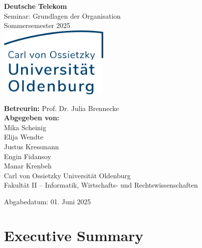 \documentclass[12pt,a4paper]{article}
\begin{document}
	
	\begin{titlepage}
		\centering
		\vfill
		{\Huge \textbf{Deutsche Telekom}}\\[1.5cm]
		\large
		Seminar: Grundlagen der Organisation\\
		Sommersemester 2025\\[2cm]
		\includegraphics[width=0.4\textwidth]{images/UOL-Logo.png}\\[2cm]
		\normalsize
		\begin{flushleft}
			\textbf{Betreurin:} Prof. Dr. Julia Brennecke\\[0.5cm]
			\textbf{Abgegeben von:}\\
			Mika Scheinig\\
			Elija Wendte\\
			Justus Kressmann\\
			Engin Fidansoy\\
			Manar Krenbeh\\[0.5cm]
			Carl von Ossietzky Universität Oldenburg\\
			Fakultät II – Informatik, Wirtschafts- und Rechtswissenschaften\\
		\end{flushleft}
		\vfill
		\begin{flushright}
			Abgabedatum: 01. Juni 2025
		\end{flushright}
	\end{titlepage}
	
	
	\section*{\texorpdfstring{Executive Summary}{Executive Summary }}\label{executive-summary}
	
\end{document}
